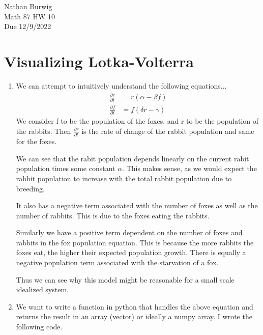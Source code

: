 \documentclass[11pt]{article}
\begin{document}
    \noindent Nathan Burwig \\
    Math 87 HW 10 \\
    Due 12/9/2022
    
    \hrulefill
    
    \section{Visualizing Lotka-Volterra}
    \begin{enumerate}
        \item We can attempt to intuitively understand the following
            equations...
            \begin{align*}
                \frac{\partial r}{\partial t} &= r(\alpha - \beta f) \\
                \frac{\partial f}{\partial t} &= f(\delta r - \gamma)
            \end{align*}
            We consider f to be the population of the foxes, and r to be the
            population of the rabbits. Then $\frac{\partial r}{\partial t}$ is
            the rate of change of the rabbit population and same for the foxes.

            We can see that the rabit population depends linearly on the
            current rabit population times some constant $\alpha$. This makes
            sense, as we would expect the rabbit population to increase with
            the total rabbit population due to breeding.

            It also has a negative term associated with the number of foxes as
            well as the number of rabbits. This is due to the foxes eating the
            rabbits. 

            Similarly we have a positive term dependent on the number of foxes
            and rabbits in the fox population equation. This is because the
            more rabbits the foxes eat, the higher their expected population
            growth. There is equally a negative population term associated with
            the starvation of a fox.

            Thus we can see why this model might be reasonable for a small
            scale idealized system.

        \item We want to write a function in python that handles the above
            equation and returns the result in an array (vector) or ideally a
            numpy array. I wrote the following code.


\end{enumerate}
\end{document}
